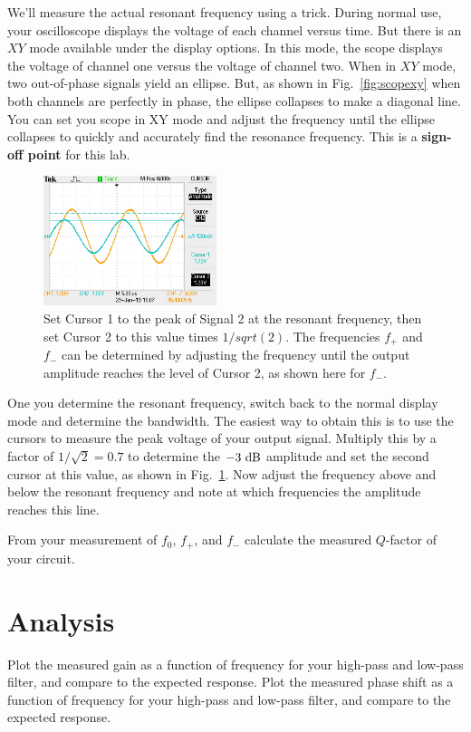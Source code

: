 We'll measure the actual resonant frequency using a trick.  During normal
use, your oscilloscope displays the voltage of each channel versus
time.  But there is an $XY$ mode available under the display options.
In this mode, the scope displays the voltage of channel one versus the
voltage of channel two.  When in $XY$ mode, two out-of-phase signals
yield an ellipse.  But, as shown in Fig.~\ref{fig:scopexy} when both
channels are perfectly in phase, the ellipse collapses to make a
diagonal line.  You can set you scope in XY mode and adjust the
frequency until the ellipse collapses to quickly and accurately find
the resonance frequency.  This is a {\bf sign-off point} for this lab.

\begin{figure}[htbp]
\begin{center}
\includegraphics[width=0.45\textwidth]{figs/labs/filters/qscope.jpg}
\end{center}
\caption{\label{fig:qscope} Set Cursor 1 to the peak of Signal 2 at the resonant frequency, then set Cursor 2 to this value times $1/sqrt(2)$.  The frequencies $f_+$ and $f_-$ can be determined by adjusting the frequency until the output amplitude reaches the level of Cursor 2, as shown here for $f_-$.
}
\end{figure}


One you determine the resonant frequency, switch back to the normal
display mode and determine the bandwidth.  The easiest way to obtain
this is to use the cursors to measure the peak voltage of your output
signal.  Multiply this by a factor of $1/\sqrt{2} = 0.7$ to determine
the $-3~\rm dB$ amplitude and set the second cursor at this value, as
shown in Fig.~\ref{fig:qscope}.  Now adjust the frequency above and
below the resonant frequency and note at which frequencies the
amplitude reaches this line.

From your measurement of $f_0$, $f_+$, and $f_-$ calculate the
measured $Q$-factor of your circuit.

\section{Analysis}

Plot the measured gain as a function of frequency for your high-pass
and low-pass filter, and compare to the expected response.  Plot the
measured phase shift as a function of frequency for your high-pass and
low-pass filter, and compare to the expected response.
